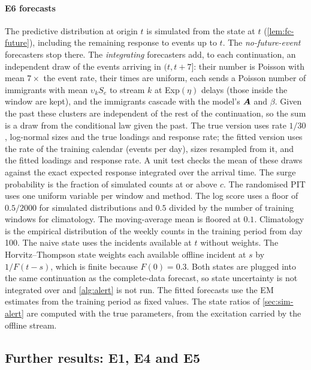 \paragraph{E6 forecasts} The predictive distribution at origin $t$ is simulated from the
state at $t$ (\cref{lem:fc-future}), including the remaining response to events up to $t$.
The \emph{no-future-event} forecasters stop there. The \emph{integrating} forecasters add,
to each continuation, an independent draw of the events arriving in $(t,t+7]$: their number
is Poisson with mean $7\times$ the event rate, their times are uniform, each sends a Poisson
number of immigrants with mean $\upsilon_kS_e$ to stream $k$ at Exp$(\eta)$ delays (those
inside the window are kept), and the immigrants cascade with the model's $\bm{A}$ and
$\beta$. Given the past these clusters are independent of the rest of the continuation, so
the sum is a draw from the conditional law given the past. The true version uses rate
$1/30$, log-normal sizes and the true loadings and response rate; the fitted version uses
the rate of the training calendar (events per day), sizes resampled from it, and the fitted
loadings and response rate. A unit test checks the mean of these draws against the exact
expected response integrated over the arrival time. The surge probability is the fraction
of simulated counts at or above $c$. The randomised PIT uses one uniform variable per
window and method. The log score uses a floor of $0.5/2000$ for simulated distributions and
$0.5$ divided by the number of training windows for climatology. The moving-average mean is
floored at $0.1$. Climatology is the empirical distribution of the weekly counts in the
training period from day 100. The naive state uses the incidents available at $t$ without
weights. The Horvitz--Thompson state weights each available offline incident at $s$ by
$1/F(t-s)$, which is finite because $F(0)=0.3$. Both states are plugged into the same
continuation as the complete-data forecast, so state uncertainty is not integrated over and
\cref{alg:alert} is not run. The fitted forecasts use the EM estimates from the training
period as fixed values. The state ratios of \cref{sec:sim-alert} are computed with the true
parameters, from the excitation carried by the offline stream.

\subsection{Further results: E1, E4 and E5}\label{app:sim-e1e5}

\begin{table}[t]
\centering
\caption{E1, recovery by EM (synthetic data, $R=100$ per $T$). Cov.: coverage of nominal
$95\%$ intervals. Group rows: mean $|$bias$|$, mean RMSE and range of coverage over the
entries. Stream 1 is offline region A, stream 3 the online stream.}
\label{tab:sim-e1}
\footnotesize

\end{table}

